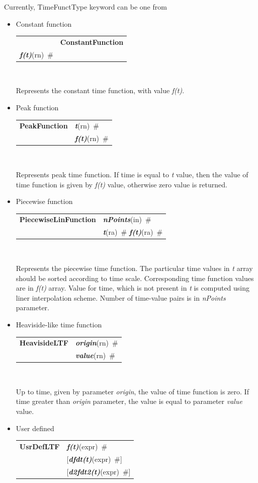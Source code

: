 \documentclass[a4paper]{article}
\makeatletter
\newcommand{\param}[1]{{\em #1}}
\newcommand{\keywordnotype}[1]{\mbox{{\it{\bf{#1}}}}}
\newcommand{\keyword}[2]{\mbox{{\keywordnotype{#1}\tiny (#2)}}}
\newcommand{\entKeywordInst}[1]{\mbox{{\bf{{#1}}}}}
\newcommand{\field}[2]{\mbox{\keyword{#1}{#2}~\#}}
\newcommand{\optField}[2]{\mbox{[\field{#1}{#2}]}}
\newenvironment{record}[1][]{\begin{tabular}{|ll}}{\end{tabular}\\}
\newcommand{\recentry}[2]{{#1}&{#2}\\}
\newcounter{rcc}
\newenvironment{record}[1][\textwidth]{\setcounter{rcc}{0}\begin{tabular*}{#1}{|ll@{\extracolsep{\fill}}r}}{\end{tabular*}\\}
\newcommand{\recentry}[2]{\ifthenelse{\value{rcc}>0}{&$\backslash$ \\}{\setcounter{rcc}{1}}{#1}&{#2}}
\makeatother
\begin{document}
Currently, TimeFunctType keyword can be one from
\begin{itemize} 
\item Constant function

\noindent
\begin{record}[0.9\textwidth]
  \recentry{}{\entKeywordInst{ConstantFunction}}{\field{f(t)}{rn}}
\end{record}

Represents the constant time function, with value \param{f(t)}.

\item Peak function

  \begin{record}[0.9\textwidth]
    \recentry{\entKeywordInst{PeakFunction}}{\field{t}{rn}}
    \recentry{}{\field{f(t)}{rn}}
  \end{record}
  
Represents peak time function. If time is equal to \param{t}
value, then the value of time function is given by \param{f(t)} value,
otherwise zero value is returned.

\item Piecewise function

  \begin{record}[0.9\textwidth]
    \recentry{\entKeywordInst{PiecewiseLinFunction}}{\field{nPoints}{in}}
    \recentry{}{\field{t}{ra} \field{f(t)}{ra}}
  \end{record}

  Represents the piecewise time function. The particular time values in
\param{t} array  should be sorted according to time scale. Corresponding time
function values are in \param{f(t)} array. Value for time, which
is not present in \param{t} is computed using liner interpolation scheme.
Number of time-value pairs is in \param{nPoints} parameter.
\item Heaviside-like time function

  \begin{record}[0.9\textwidth]
    \recentry{\entKeywordInst{HeavisideLTF}}{\field{origin}{rn}}
    \recentry{}{\field{value}{rn}}
  \end{record}
  
Up to time, given by
parameter \param{origin}, the value of time function is zero. If time
greater than \param{origin} parameter, the value is
equal to parameter \param{value} value.
\item User defined 

  \begin{record}[0.9\textwidth]
    \recentry{\entKeywordInst{UsrDefLTF}}{\field{f(t)}{expr}}
    \recentry{}{\optField{dfdt(t)}{expr}} \recentry{}{\optField{d2fdt2(t)}{expr}}
  \end{record}
  

\end{itemize}
\end{document}
